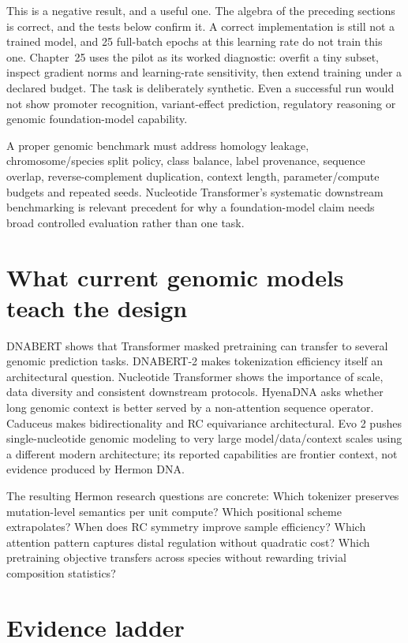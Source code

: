 This is a negative result, and a useful one. The algebra of the preceding sections is
correct, and the tests below confirm it. A correct implementation is still not a
trained model, and 25 full-batch epochs at this learning rate do not train this one.
Chapter~25 uses the pilot as its worked diagnostic: overfit a tiny subset, inspect
gradient norms and learning-rate sensitivity, then extend training under a declared
budget. The task is deliberately synthetic. Even a successful run would not show
promoter recognition, variant-effect prediction, regulatory reasoning or genomic
foundation-model capability.

A proper genomic benchmark must address homology leakage, chromosome/species split
policy, class balance, label provenance, sequence overlap, reverse-complement
duplication, context length, parameter/compute budgets and repeated seeds. Nucleotide
Transformer's systematic downstream benchmarking is relevant precedent for why a
foundation-model claim needs broad controlled evaluation rather than one task.
\cite{nt2025}

\section{What current genomic models teach the design}

DNABERT shows that Transformer masked pretraining can transfer to several genomic
prediction tasks. DNABERT-2 makes tokenization efficiency itself an architectural
question. Nucleotide Transformer shows the importance of scale, data diversity and
consistent downstream protocols. HyenaDNA asks whether long genomic context is
better served by a non-attention sequence operator. Caduceus makes bidirectionality
and RC equivariance architectural. Evo 2 pushes single-nucleotide genomic modeling
to very large model/data/context scales using a different modern architecture; its
reported capabilities are frontier context, not evidence produced by Hermon DNA.
\cite{dnabert2021,dnabert2,nt2025,hyenadna,caduceus,evo2}

The resulting Hermon research questions are concrete:
Which tokenizer preserves mutation-level semantics per unit compute? Which positional
scheme extrapolates? When does RC symmetry improve sample efficiency? Which attention
pattern captures distal regulation without quadratic cost? Which pretraining
objective transfers across species without rewarding trivial composition statistics?

\section{Evidence ladder}

